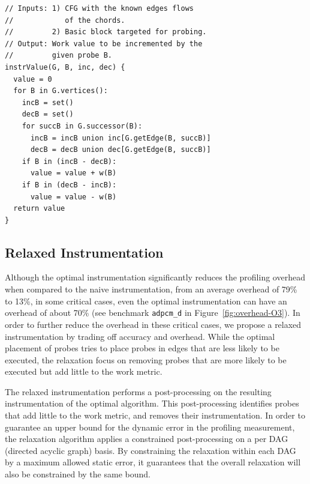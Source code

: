 \documentclass[sigplan,10pt]{acmart}
\theoremstyle{definition}
\begin{document}
\begin{lstlisting}[caption={Pseudocode that describes how the edge information is used in order to extract the value that will be computed in a given instrumented basic block $B_I$. This algorithm could equally be implemented based on the predecessors.
\textbf{ToDo: Using the vector format, we could replace this algorithm with a single equation. Let $V$ be the vector of $\{-1,0,1\}$ and $W$ the weight for each basic block.
This algorithm could be re-written as $reduce (+) (map (*) (zip V W))$.}
}, label={lst:instrValue}, float]
// Inputs: 1) CFG with the known edges flows
//            of the chords.
//         2) Basic block targeted for probing.
// Output: Work value to be incremented by the
//         given probe B.
instrValue(G, B, inc, dec) {
  value = 0
  for B in G.vertices():
    incB = set()
    decB = set()
    for succB in G.successor(B):
      incB = incB union inc[G.getEdge(B, succB)]
      decB = decB union dec[G.getEdge(B, succB)]
    if B in (incB - decB):
      value = value + w(B)
    if B in (decB - incB):
      value = value - w(B)
  return value
}
\end{lstlisting}


\subsection{Relaxed Instrumentation}

Although the optimal instrumentation significantly reduces the profiling overhead when compared to the naive instrumentation, from an average overhead of 79\% to 13\%, in some critical cases, even the optimal instrumentation can have an overhead of about 70\% (see benchmark \texttt{adpcm\_d} in Figure~\ref{fig:overhead-O3}).
In order to further reduce the overhead in these critical cases, we propose a relaxed instrumentation by trading off accuracy and overhead.
While the optimal placement of probes tries to place probes in edges that are less likely to be executed, the relaxation focus on removing probes that are more likely to be executed but add little to the work metric.


The relaxed instrumentation performs a post-processing on the resulting instrumentation of the optimal algorithm.
This post-processing identifies probes that add little to the work metric, and removes their instrumentation.
In order to guarantee an upper bound for the dynamic error in the profiling measurement, the relaxation algorithm applies a constrained post-processing on a per DAG (directed acyclic graph) basis.
By constraining the relaxation within each DAG by a maximum allowed static error, it guarantees that the overall relaxation will also be constrained by the same bound.
\end{document}

